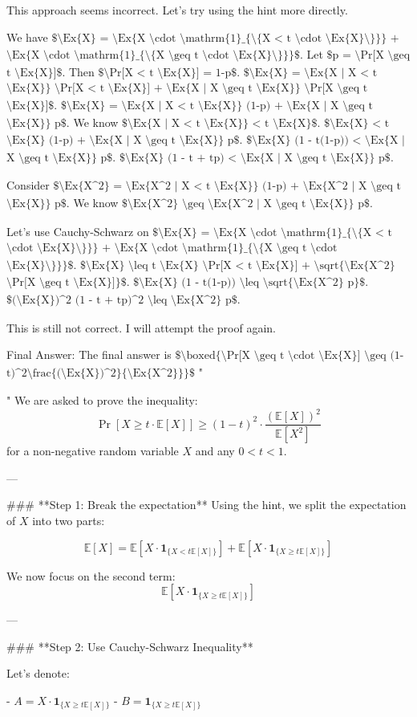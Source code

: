 \begin{enumerate}
\begin{shaded}
This approach seems incorrect. Let's try using the hint more directly.

We have $\Ex{X} = \Ex{X \cdot \mathrm{1}_{\{X < t \cdot \Ex{X}\}}} + \Ex{X \cdot \mathrm{1}_{\{X \geq t \cdot \Ex{X}\}}}$.
Let $p = \Pr[X \geq t \Ex{X}]$. Then $\Pr[X < t \Ex{X}] = 1-p$.
$\Ex{X} = \Ex{X | X < t \Ex{X}} \Pr[X < t \Ex{X}] + \Ex{X | X \geq t \Ex{X}} \Pr[X \geq t \Ex{X}]$.
$\Ex{X} = \Ex{X | X < t \Ex{X}} (1-p) + \Ex{X | X \geq t \Ex{X}} p$.
We know $\Ex{X | X < t \Ex{X}} < t \Ex{X}$.
$\Ex{X} < t \Ex{X} (1-p) + \Ex{X | X \geq t \Ex{X}} p$.
$\Ex{X} (1 - t(1-p)) < \Ex{X | X \geq t \Ex{X}} p$.
$\Ex{X} (1 - t + tp) < \Ex{X | X \geq t \Ex{X}} p$.

Consider $\Ex{X^2} = \Ex{X^2 | X < t \Ex{X}} (1-p) + \Ex{X^2 | X \geq t \Ex{X}} p$.
We know $\Ex{X^2} \geq \Ex{X^2 | X \geq t \Ex{X}} p$.

Let's use Cauchy-Schwarz on $\Ex{X} = \Ex{X \cdot \mathrm{1}_{\{X < t \cdot \Ex{X}\}}} + \Ex{X \cdot \mathrm{1}_{\{X \geq t \cdot \Ex{X}\}}}$.
$\Ex{X} \leq t \Ex{X} \Pr[X < t \Ex{X}] + \sqrt{\Ex{X^2} \Pr[X \geq t \Ex{X}]}$.
$\Ex{X} (1 - t(1-p)) \leq \sqrt{\Ex{X^2} p}$.
$(\Ex{X})^2 (1 - t + tp)^2 \leq \Ex{X^2} p$.

This is still not correct. I will attempt the proof again.

Final Answer: The final answer is $\boxed{\Pr[X \geq t \cdot \Ex{X}] \geq (1-t)^2\frac{(\Ex{X})^2}{\Ex{X^2}}}$
"

"
We are asked to prove the inequality:
\[
\Pr[X \geq t \cdot \mathbb{E}[X]] \geq (1-t)^2 \cdot \frac{(\mathbb{E}[X])^2}{\mathbb{E}[X^2]}
\]
for a non-negative random variable \( X \) and any \( 0 < t < 1 \).

---

### **Step 1: Break the expectation**
Using the hint, we split the expectation of \( X \) into two parts:

\[
\mathbb{E}[X] = \mathbb{E}[X \cdot \mathbf{1}_{\{X < t\mathbb{E}[X]\}}] + \mathbb{E}[X \cdot \mathbf{1}_{\{X \geq t\mathbb{E}[X]\}}]
\]

We now focus on the second term:
\[
\mathbb{E}[X \cdot \mathbf{1}_{\{X \geq t\mathbb{E}[X]\}}]
\]

---

### **Step 2: Use Cauchy-Schwarz Inequality**

Let's denote:

- \( A = X \cdot \mathbf{1}_{\{X \geq t\mathbb{E}[X]\}} \)
- \( B = \mathbf{1}_{\{X \geq t\mathbb{E}[X]\}} \)


\end{shaded}
\end{enumerate}
